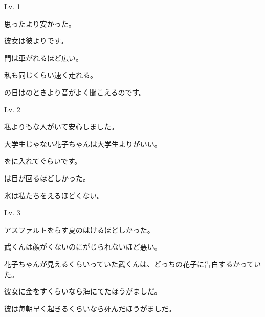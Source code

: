 
\author{Tomislav Mamić}

	
	
	\begin{mondai}{Lv. 1}
		\Large
		\item 思ったより安かった。
		\item 彼女は彼よりです。
		\item 門は車がれるほど広い。
		\item 私も同じくらい速く走れる。
		\item {}の日はのときより音がよく聞こえるのです。
	\end{mondai}

	\begin{mondai}{Lv. 2}
		\Large
		\item 私よりもな人がいて安心しました。
		\item 大学生じゃない花子ちゃんは大学生よりがいい。
		\item {}をに入れてぐらいです。
		\item {}は目が回るほどしかった。
		\item 氷は私たちをえるほどくない。
	\end{mondai}

	\begin{mondai}{Lv. 3}
		\Large
		\item アスファルトをらす夏のはけるほどしかった。
		\item 武くんは顔がくないのにがじられないほど悪い。
		\item 花子ちゃんが見えるくらいっていた武くんは、どっちの花子に告白するかっていた。
		\item *彼女に金をすくらいなら海にてたほうがましだ。
		\item *彼は毎朝早く起きるくらいなら死んだほうがましだ。
	\end{mondai}

